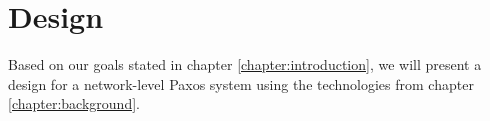 \chapter{Design}
\label{chapter:design}

Based on our goals stated in chapter \ref{chapter:introduction}, we will
present a design for a network-level Paxos system using the technologies
from chapter \ref{chapter:background}.




